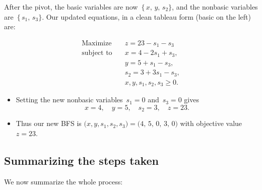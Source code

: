 After the pivot, the basic variables are now
\(\,\{\,x,\,y,\,s_2\}\), 
and the nonbasic variables are 
\(\,\{\,s_1,\,s_3\}\).  
Our updated equations, in a clean tableau form (basic on the left) are:

\[
\begin{aligned}
\text{Maximize}\quad 
& z = 23 - s_1 - s_3 \\
\text{subject to}\quad 
& x = 4 - 2s_1 + s_3, \\
& y = 5 + s_1 - s_3, \\
& s_2 = 3 + 3s_1 - s_3, \\
& x, y, s_1, s_2, s_3 \geq 0.
\end{aligned}
\]

\begin{itemize}
  \item Setting the new nonbasic variables \(\,s_1=0\) and \(\,s_3=0\) gives
  \[
  x=4, \quad y=5,\quad s_2=3,\quad z=23.
  \]
  \item Thus our new BFS is 
  \(\bigl(x,y,s_1,s_2,s_3\bigr)=\bigl(4,\,5,\,0,\,3,\,0\bigr)\) 
  with objective value \(z=23\).
\end{itemize}

\subsection{Summarizing the steps taken}
We now summarize the whole process:

